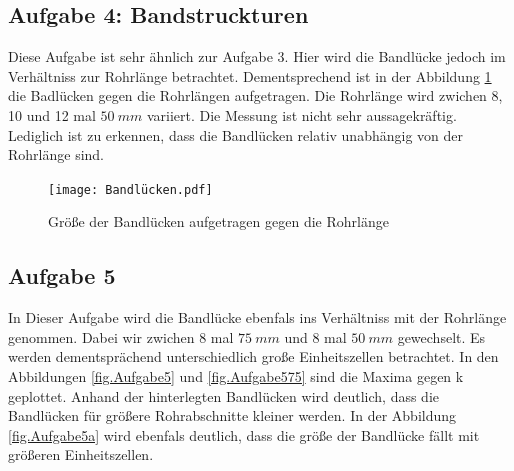 \subsection{Aufgabe 4: Bandstruckturen}
Diese Aufgabe ist sehr ähnlich zur Aufgabe 3. Hier wird die Bandlücke jedoch im Verhältniss zur Rohrlänge betrachtet.
Dementsprechend ist in der Abbildung \ref{fig.Aufgabe4} die Badlücken gegen die Rohrlängen aufgetragen.
Die Rohrlänge wird zwichen 8, 10 und 12 mal $\SI{50}{mm}$ variiert.
Die Messung ist nicht sehr aussagekräftig.
Lediglich ist zu erkennen, dass die Bandlücken relativ unabhängig von der Rohrlänge sind.
\begin{figure}[h!]
  \centering
  \texttt{[image: Bandlücken.pdf]}
  \caption{Größe der Bandlücken aufgetragen gegen die Rohrlänge}
  \label{fig.Aufgabe4}
\end{figure}
\FloatBarrier

\subsection{Aufgabe 5}
In Dieser Aufgabe wird die Bandlücke ebenfals ins Verhältniss mit der Rohrlänge genommen. Dabei wir zwichen 8 mal $\SI{75}{mm}$ und 8 mal $\SI{50}{mm}$ gewechselt.
Es werden dementsprächend unterschiedlich große Einheitszellen betrachtet.
In den Abbildungen \ref{fig.Aufgabe5} und \ref{fig.Aufgabe575} sind die Maxima gegen k geplottet. Anhand der hinterlegten Bandlücken wird deutlich, dass die Bandlücken für größere Rohrabschnitte kleiner werden.
In der Abbildung \ref{fig.Aufgabe5a} wird ebenfals deutlich, dass die größe der Bandlücke fällt mit größeren Einheitszellen.

